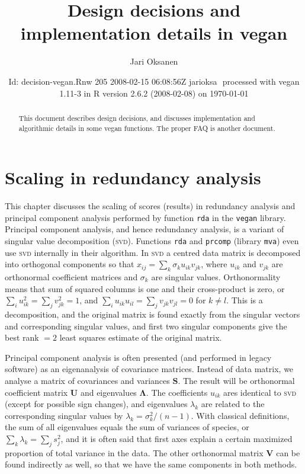 \documentclass[a4paper,10pt]{amsart}
\author{Jari Oksanen}
\title{Design decisions and implementation details in vegan}
\date{$ $Id: decision-vegan.Rnw 205 2008-02-15 06:08:56Z jarioksa $ $
  processed with vegan
1.11-3
in R version 2.6.2 (2008-02-08) on \today}
\begin{document}

\maketitle

\begin{abstract}

\noindent This document describes design decisions, and discusses implementation
and algorithmic details in some vegan functions. The proper FAQ is
another document.

\end{abstract}

\tableofcontents

\section{Scaling in redundancy analysis}

This chapter discusses the scaling of scores (results) in redundancy
analysis and principal component analysis performed by function
\texttt{rda} in the \texttt{vegan} library.  Principal component
analysis, and hence redundancy analysis, is a variant of singular
value decomposition (\textsc{svd}).  Functions \texttt{rda} and
\texttt{prcomp} (library \texttt{mva}) even use \textsc{svd}
internally in their algorithm.  In \textsc{svd} a centred data matrix
is decomposed into orthogonal components so that $x_{ij} = \sum_k
\sigma_k u_{ik} v_{jk}$, where $u_{ik}$ and $v_{jk}$ are orthonormal
coefficient matrices and $\sigma_k$ are singular values.
Orthonormality means that sum of squared columns is one and their
cross-product is zero, or $\sum_i u_{ik}^2 = \sum_j v_{jk}^2 = 1$, and
$\sum_i u_{ik} u_{il} = \sum_j v_{jk} v_{jl} = 0$ for $k \neq l$. This
is a decomposition, and the original matrix is found exactly from the
singular vectors and corresponding singular values, and first two
singular components give the best rank $=2$ least squares estimate of
the original matrix.

Principal component analysis is often presented (and performed in
legacy software) as an eigenanalysis of covariance matrices.  Instead
of data matrix, we analyse a matrix of covariances and variances
$\mathbf{S}$.  The result will be orthonormal coefficient matrix
$\mathbf{U}$ and eigenvalues $\mathbf{\Lambda}$.  The coefficients
$u_{ik}$ ares identical to \textsc{svd} (except for possible sign
changes), and eigenvalues $\lambda_k$ are related to the corresponding
singular values by $\lambda_k = \sigma_k^2 /(n-1)$.  With classical
definitions, the sum of all eigenvalues equals the sum of variances of
species, or $\sum_k \lambda_k = \sum_j s_j^2$, and it is often said
that first axes explain a certain maximized proportion of total
variance in the data.  The other orthonormal matrix $\mathbf{V}$ can
be found indirectly as well, so that we have the same components in
both methods.
\end{document}
